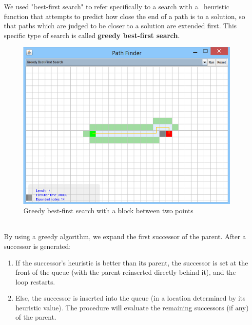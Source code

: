\documentclass[a4paper]{article}
\begin{document}
\noindent We used "best-first search" to refer specifically to a search with a  heuristic function that attempts to predict how close the end of a path is to a solution, so that paths which are judged to be closer to a solution are extended first. This specific type of search is called \textbf{greedy best-first search}. \\

\begin{figure}[h!]
  \centering
    \includegraphics[scale=.9]{images/greedy1.png}
  \caption{Greedy best-first search with a block between two points}
\end{figure}

\noindent \\
By using a greedy algorithm, we expand the first successor of the parent. After a successor is generated: \\
\begin{enumerate}
	\item If the successor's heuristic is better than its parent, the successor is set at the front of the queue (with the parent reinserted directly behind it), and the loop restarts.
	\item Else, the successor is inserted into the queue (in a location determined by its heuristic value). The procedure will evaluate the remaining successors (if any) of the parent.
\end{enumerate}

\end{document}
